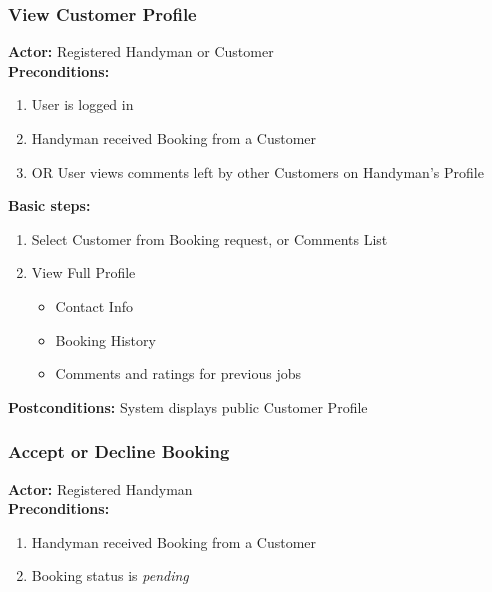 \documentclass[11pt,a4paper]{article}
\begin{document}
\subsubsection{View Customer Profile}

\textbf{Actor:} Registered Handyman or Customer \\
\textbf{Preconditions:}
\begin{enumerate}
\item User is logged in
\item Handyman received Booking from a Customer
\item OR User views comments left by other Customers on Handyman's Profile
\end{enumerate}

\textbf{Basic steps:}
\begin{enumerate}
\item Select Customer from Booking request, or Comments List
\item View Full Profile
  \begin{itemize}
  \item Contact Info
  \item Booking History
  \item Comments and ratings for previous jobs  
  \end{itemize}
\end{enumerate}
\textbf{Postconditions:} System displays public Customer Profile


\subsubsection{Accept or Decline Booking}

\textbf{Actor:} Registered Handyman \\
\textbf{Preconditions:}
\begin{enumerate}
\item Handyman received Booking from a Customer
\item Booking status is \textit{pending}
\end{enumerate}
\end{document}
